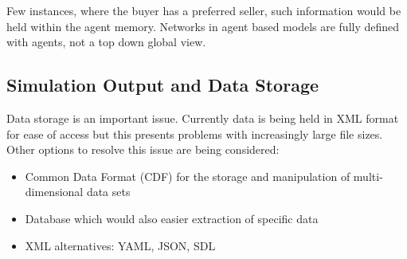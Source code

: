 \documentclass[a4paper,11pt]{article}
\begin{document}
Few instances, where the buyer has a preferred seller, such
information would be held within the agent memory. Networks in agent
based models are fully defined with agents, not a top down global
view.





\subsection{Simulation Output and Data Storage}

Data storage is an important issue. Currently data is being held in
XML format for ease of access but this presents problems with
increasingly large file sizes. Other
options to resolve this issue are being considered:

\begin{itemize}
\item Common Data Format (CDF) for the storage and manipulation of multi-dimensional data sets
\item Database which would also easier extraction of specific data
\item XML alternatives: YAML, JSON, SDL
\end{itemize}
\end{document}
